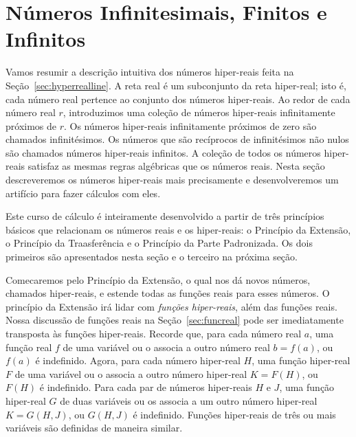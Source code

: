 \section{Números Infinitesimais, Finitos e Infinitos}
\label{sec:infnumbers}

Vamos resumir a descrição intuitiva dos números hiper-reais feita
na Seção~\ref{sec:hyperrealline}. A reta real é um subconjunto da
reta hiper-real; isto é, cada número real pertence ao conjunto dos
números hiper-reais. Ao redor de cada número real $r$, introduzimos
uma coleção de números hiper-reais infinitamente próximos de $r$. Os
números hiper-reais infinitamente próximos de zero são chamados
infinitésimos. Os números que são recíprocos de infinitésimos não nulos
são chamados números hiper-reais infinitos. A coleção de todos os números
hiper-reais satisfaz as mesmas regras algébricas que os números reais.
Nesta seção descreveremos os números hiper-reais mais precisamente
e desenvolveremos um artifício para fazer cálculos com eles.

Este curso de cálculo é inteiramente desenvolvido a partir de três
princípios básicos que relacionam os números reais e os hiper-reais:
o Princípio da Extensão, o Princípio da Traasferência e o Princípio
da Parte Padronizada. Os dois primeiros são apresentados nesta seção
e o terceiro na próxima seção.

Comecaremos pelo Princípio da Extensão, o qual nos dá novos números,
chamados hiper-reais, e estende todas as funções reais para esses números.
O princípio da Extensão irá lidar com \emph{funções hiper-reais}, além
das funções reais. Nossa discussão de funções reais na
Seção~\ref{sec:funcreal} pode ser imediatamente transposta às funções
hiper-reais. Recorde que, para cada número real $a$, uma função real $f$
de uma variável ou o associa a outro número real $b = f(a)$, ou $f(a)$
é indefinido. Agora, para cada número hiper-real $H$, uma função hiper-real
$F$ de uma variável ou o associa a outro número hiper-real $K = F(H)$, ou
$F(H)$ é indefinido. Para cada par de números hiper-reais $H$ e $J$, uma
função hiper-real $G$ de duas variáveis ou os associa a um outro número
hiper-real $K = G(H,J)$, ou $G(H,J)$ é indefinido. Funções hiper-reais
de três ou mais variáveis são definidas de maneira similar.


